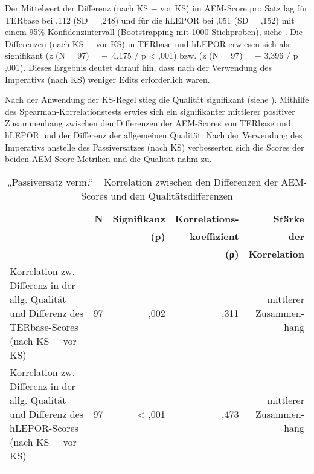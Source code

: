 Der Mittelwert der Differenz (nach KS $-$ vor KS) im AEM-Score pro Satz lag für TERbase bei ,112 (SD = ,248) und für die hLEPOR bei ,051 (SD = ,152) mit einem 95\%-Konfidenzintervall (Bootstrapping mit 1000 Stichproben), siehe . Die Differenzen (nach KS $-$ vor KS) in TERbase und hLEPOR erwiesen sich als signifikant (z (N = 97) = $-$~4,175 / p < ,001) bzw. (z (N = 97) = $-$ 3,396 / p = ,001). Dieses Ergebnis deutet darauf hin, dass nach der Verwendung des Imperativs (nach KS) weniger Edits erforderlich waren.


Nach der Anwendung der KS-Regel stieg die Qualität signifikant (siehe ). Mithilfe des Spearman-Korrelationstests erwies sich ein signifikanter mittlerer positiver Zusammenhang zwischen den Differenzen der AEM-Scores von TERbase und hLEPOR und der Differenz der allgemeinen Qualität. Nach der Verwendung des Imperativs anstelle des Passiversatzes (nach KS) verbesserten sich die Scores der beiden AEM-Score-Metriken und die Qualität nahm zu.


\begin{table}
\begin{tabularx}{\textwidth}{Xrrrr}

\lsptoprule
& \textbf{N} & { \textbf{Signifikanz}} & \textbf{Korrelations-} & \textbf{Stärke}\\
& & \textbf{(p)} & \textbf{koeffizient} & \textbf{der}\\
& & & \textbf{(ρ)} &  \textbf{Korrelation}\\
\midrule
Korrelation zw. Differenz in der allg. Qualität und Differenz des TERbase-Scores (nach KS $-$ vor KS) & { 97} & ,002 & ,311 & \makecell[tr]{mittlerer\\Zusammen-\\hang}\\
\tablevspace
Korrelation zw. Differenz in der allg. Qualität und Differenz des hLEPOR-Scores (nach KS $-$ vor KS) & 97 & < ,001 & ,473 & \makecell[tr]{mittlerer\\Zusammen-\\hang}\\
\lspbottomrule
\end{tabularx}
\caption{\label{tab:05:73}„Passiversatz verm.“ -- Korrelation zwischen den Differenzen der AEM-Scores und den Qualitätsdifferenzen   }
\end{table}

